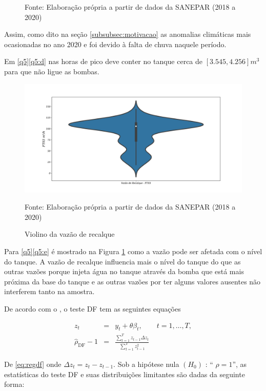 \begin{itemize}
\begin{figure}[H]
	Fonte: Elaboração própria a partir de dados da SANEPAR (2018 a 2020)
\end{figure}

Assim, como dito na seção \ref{subsubsec:motivacao} as anomalias climáticas mais ocasionadas no ano 2020 e foi devido à falta de chuva naquele período.

Em \ref{q5}\ref{q5:d} nas horas de pico deve conter no tanque cerca de $[3.545,4.256] m^3$ para que não ligue as bombas.


\begin{figure}[H]
	\centering
	\caption{Violino da vazão de recalque}
	\label{fig:ft03}
	\includegraphics[width=1\linewidth]{Resultados/Figuras/ft03}
	
	Fonte: Elaboração própria a partir de dados da SANEPAR (2018 a 2020)
\end{figure}

Para \ref{q5}\ref{q5:e} é mostrado na Figura \ref{fig:ft03} como a vazão pode ser afetada com o nível do tanque. A vazão de recalque influencia mais o nível do tanque do que as outras vazões porque injeta água no tanque através da bomba que está mais próxima da base do tanque e as outras vazões por ter alguns valores ausentes não interferem tanto na amostra.


\end{itemize}

De acordo com o , o teste DF tem as seguintes equações

\begin{eqnarray}
	z_t&=& y_t+\theta \beta_t, \qquad t=1,\ldots, T, \label{eq:df3}\\	
\hat{\rho}_{\mathrm{DF}}-1&=&\frac{\sum_{t=1}^T z_{t-1} \Delta z_t}{\sum_{t=1}^T z_{t-1}^2} \label{eq:regdf}
\end{eqnarray}

De \eqref{eq:regdf} onde $\Delta z_t=z_t-z_{t-1}$. Sob a hipótese nula $\left(H_0\right)$ : `` $\rho=1$'', as estatísticas do teste DF e suas distribuições limitantes são dadas da seguinte forma:


